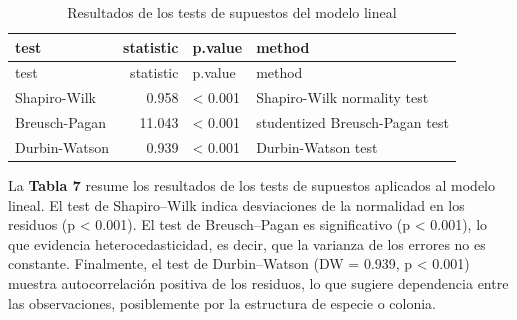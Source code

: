 \documentclass[
  spanish,
  11pt,
  a4paper,
  DIV=11,
  numbers=noendperiod]{scrartcl}
\begin{document}
\begin{longtable}[]{@{}lrll@{}}
\caption{Resultados de los tests de supuestos del modelo
lineal}\tabularnewline
\toprule\noalign{}
test & statistic & p.value & method \\
\midrule\noalign{}
\endfirsthead
\toprule\noalign{}
test & statistic & p.value & method \\
\midrule\noalign{}
\endhead
\bottomrule\noalign{}
\endlastfoot
Shapiro-Wilk & 0.958 & \textless{} 0.001 & Shapiro-Wilk normality
test \\
Breusch-Pagan & 11.043 & \textless{} 0.001 & studentized Breusch-Pagan
test \\
Durbin-Watson & 0.939 & \textless{} 0.001 & Durbin-Watson test \\
\end{longtable}

La \textbf{Tabla 7} resume los resultados de los tests de supuestos
aplicados al modelo lineal. El test de Shapiro--Wilk indica desviaciones
de la normalidad en los residuos (p \textless{} 0.001). El test de
Breusch--Pagan es significativo (p \textless{} 0.001), lo que evidencia
heterocedasticidad, es decir, que la varianza de los errores no es
constante. Finalmente, el test de Durbin--Watson (DW = 0.939, p
\textless{} 0.001) muestra autocorrelación positiva de los residuos, lo
que sugiere dependencia entre las observaciones, posiblemente por la
estructura de especie o colonia.
\end{document}
